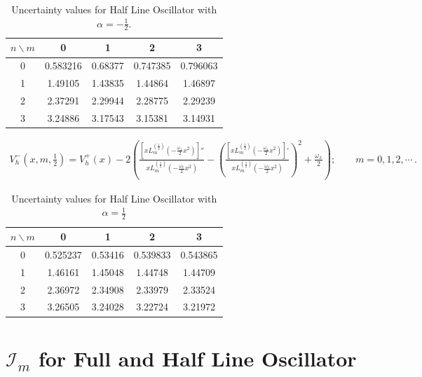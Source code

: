 \documentclass[12pt]{article}
\begin{document}
\begin{table}[h!]
\centering
\begin{tabular}{c|c|c|c|c}
\hline
$n \backslash m$ & 0     & 1       & 2       & 3       \\ \hline
0 & 0.583216 & 0.68377  & 0.747385 & 0.796063 \\
1 & 1.49105  & 1.43835  & 1.44864  & 1.46897  \\
2 & 2.37291  & 2.29944  & 2.28775  & 2.29239  \\
3 & 3.24886  & 3.17543  & 3.15381  & 3.14931  \\ \hline
\end{tabular}
\caption{Uncertainty values for Half Line Oscillator with $\alpha = -\tfrac{1}{2}$.}
\label{tab:uncertainty_halfl}
\end{table}


\begin{align}\label{HLO:V-alpha+}\nonumber
V_h^-(x, m, \frac{1}{2}) = V_h^+(x) - 2\left( \frac{\left[x L_m^{(\frac{1}{2})}\left(-\frac{\omega_x}{2} x^2\right)\right]''}{x L_m^{(\frac{1}{2})}\left(-\frac{\omega_x}{2} x^2\right)} - \left( \frac{\left[x L_m^{(\frac{1}{2})}\left(-\frac{\omega_x}{2} x^2\right)\right]'}{x L_m^{(\frac{1}{2})}\left(-\frac{\omega_x}{2} x^2\right)} \right)^2 + \frac{\omega_x}{2} \right); \qquad m = 0,1,2,\cdots \,.
\end{align}


\begin{table}[h!]
\centering
\begin{tabular}{c|c|c|c|c}
\hline
$n \backslash m$ & 0 & 1 & 2 & 3 \\ \hline
0 & 0.525237 & 0.53416  & 0.539833 & 0.543865 \\
1 & 1.46161  & 1.45048  & 1.44748  & 1.44709  \\
2 & 2.36972  & 2.34908  & 2.33979  & 2.33524  \\
3 & 3.26505  & 3.24028  & 3.22724  & 3.21972  \\ \hline
\end{tabular}
\caption{Uncertainty values for Half Line Oscillator with $\alpha = \tfrac{1}{2}$}
\label{tab:uncertainty_halfline_m123}
\end{table}



\newpage
\section*{$\mathcal{I}_m$ for Full and Half Line Oscillator}
\end{document}
